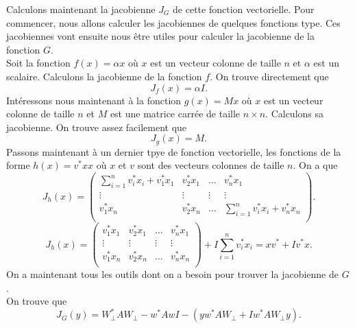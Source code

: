 Calculons maintenant la jacobienne $J_G$ de cette fonction vectorielle. Pour commencer, nous allons calculer les jacobiennes de quelques fonctions type. Ces jacobiennes vont ensuite nous être utiles pour calculer la jacobienne de la fonction $G$.\\
Soit la fonction $f(x) = \alpha x$ où $x$ est un vecteur colonne de taille $n$ et $\alpha$ est un scalaire. Calculons la jacobienne de la fonction $f$. On trouve directement que $$J_f(x) = \alpha I.$$
Intéressons nous maintenant à la fonction $g(x) = Mx$ où $x$ est un vecteur colonne de taille $n$ et $M$ est une matrice carrée de taille $n \times n$. Calculons sa jacobienne. On trouve assez facilement que $$J_g(x) = M.$$
Passons maintenant à un dernier tpye de fonction vectorielle, les fonctions de la forme $h(x) = v^* x x$ où $x$ et $v$ sont des vecteurs colonnes de taille $n$. On a que 
$$J_h(x) =
\left(\begin{array}{cccc}
\sum_{i=1}^{n}{v_i^* x_i} + v_1^* x_1 & v_2^* x_1 & \hdots & v_n^* x_1 \\
\vdots & \vdots & \vdots & \vdots\\
v_1^* x_n & v_2^* x_n & \hdots & \sum_{i=1}^{n}{v_i^* x_i} + v_n^* x_n \\
\end{array}\right).$$
$$J_h(x) =
\left(\begin{array}{cccc}
v_1^* x_1 & v_2^* x_1 & \hdots & v_n^* x_1 \\
\vdots & \vdots & \vdots & \vdots\\
v_1^* x_n & v_2^* x_n & \hdots & v_n^* x_n \\
\end{array}\right) + I\sum_{i=1}^{n}{v_i^* x_i} = xv^*+Iv^*x.
$$
On a maintenant tous les outils dont on a besoin pour trouver la jacobienne de $G$.\\
On trouve que $$J_G(y) = W_{\bot}^*AW_{\bot} - w^*AwI - (yw^*AW_{\bot}+Iw^*AW_{\bot}y).$$

















 